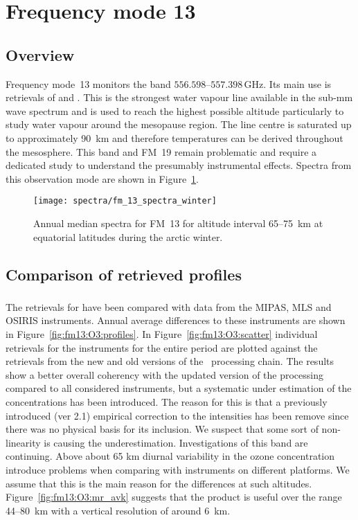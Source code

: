 \section{Frequency mode 13}
\label{sec:fm13}

\subsection{Overview}
\label{sec:fm13:overview}
Frequency mode~13 monitors the band $556.598$--$557.398\,\mathrm{GHz}$. Its
main use is retrievals of  and .
This is the strongest water vapour line available in the sub-mm wave spectrum
and is used to reach the  highest possible altitude particularly to study
water vapour around the mesopause region.  The line centre is saturated up to
approximately 90~km and therefore temperatures can be derived throughout the
mesosphere. This band and FM~19 remain problematic and require a dedicated
study to understand the presumably instrumental effects.
Spectra from this observation mode are shown in Figure~\ref{fig:spectra:13}.

\begin{figure}[ht]
    \centering
    \texttt{[image: spectra/fm\_13\_spectra\_winter]}
    \caption{Annual median spectra for FM~13 for altitude interval 65--75~km at
        equatorial latitudes during the arctic winter.
    }\label{fig:spectra:13}
\end{figure}


\subsection{Comparison of retrieved profiles}
\label{sec:fm13:comparison}



\subsubsection{}
\label{sec:fm13:comparison:O3}
The retrievals for  have been compared with data from the MIPAS, MLS
and OSIRIS instruments. Annual average differences to these instruments are
shown in Figure~\ref{fig:fm13:O3:profiles}. In Figure~\ref{fig:fm13:O3:scatter}
individual retrievals for the instruments for the entire period are plotted
against the retrievals from the new and old versions of the \smr\ processing
chain. The results show a better overall coherency with the updated version of
the processing compared to all considered instruments, but a systematic under
estimation of the concentrations has been introduced. The reason for this is
that a previously introduced  (ver 2.1) empirical correction to the intensities
has been remove since there was no physical basis for its inclusion. We suspect
that some sort of non-linearity is causing the underestimation. Investigations
of this band are continuing.  Above about 65 km diurnal variability in the
ozone concentration introduce problems when comparing with instruments on
different platforms.   We assume that this is the main reason for the
differences at such altitudes.  Figure~\ref{fig:fm13:O3:mr_avk} suggests that
the product is useful over the range 44--80~km with a vertical resolution of
around 6~km.


